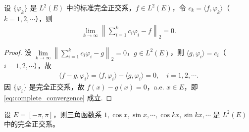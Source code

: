 \documentclass[../../main.tex]{subfiles}%
\begin{document}
\begin{theorem}
设 $\{\varphi_k\}$ 是 $L^2(E)$ 中的标准完全正交系，$f \in L^2(E)$，令 $c_k = \langle f, \varphi_k \rangle$（$k=1,2,\cdots$），则
\begin{align}
\lim_{k \to \infty} \left\| \sum_{i=1}^k c_i \varphi_i - f \right\|_2 = 0. \label{eq:complete_convergence}
\end{align}
\end{theorem}
\begin{proof}

设 $\lim\limits_{k \to \infty} \left\| \sum\limits_{i=1}^k c_i \varphi_i - g \right\|_2 = 0$，$g \in L^2(E)$，则 $\langle g, \varphi_i \rangle = c_i$（$i=1,2,\cdots$），故
\begin{align*}
\langle f - g, \varphi_i \rangle = \langle f, \varphi_i \rangle - \langle g, \varphi_i \rangle = 0, \quad i=1,2,\cdots.
\end{align*}
因 $\{\varphi_i\}$ 是完全正交系，故 $f(x) - g(x) = 0$，a.e. $x \in E$，即 \eqref{eq:complete_convergence} 成立.

\end{proof}

\begin{example}
设 $E = [-\pi, \pi]$，则三角函数系 $1, \cos x, \sin x, \cdots, \cos kx, \sin kx, \cdots$ 是 $L^2(E)$ 中的完全正交系。
\end{example}
\end{document}
